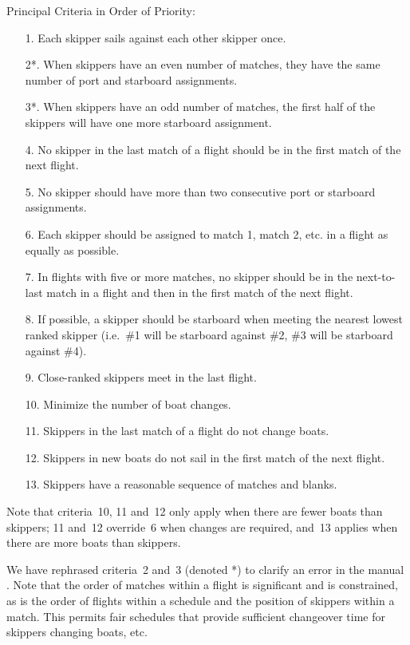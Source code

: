 \documentclass{llncs}
\begin{document}
\begin{framed}
\noindent Principal Criteria in Order of Priority:
\begin{enumerate}
\item[1.] Each skipper sails against each other skipper once.
\item[2*.] When skippers have an even number of matches, they have the same number of port and starboard
    assignments.
\item[3*.] When skippers have an odd number of matches, the first half of the skippers will have one
    more starboard assignment.
\item[4.] No skipper in the last match of a flight should be in the first match of the next flight.
\item[5.] No skipper should have more than two consecutive port or starboard assignments.
\item[6.] Each skipper should be assigned to match 1, match 2, etc. in a flight as equally as possible.
\item[7.] In flights with five or more matches, no skipper should be in the next-to-last match in a
    flight and then in the first match of the next flight.
\item[8.] If possible, a skipper should be starboard when meeting the nearest lowest ranked skipper
    (i.e.\ \#1 will be starboard against \#2, \#3 will be starboard against \#4).
\item[9.] Close-ranked skippers meet in the last flight.
\item[10.] Minimize the number of boat changes.
\item[11.] Skippers in the last match of a flight do not change boats.
\item[12.] Skippers in new boats do not sail in the first match of the next flight.
\item[13.] Skippers have a reasonable sequence of matches and blanks.
\end{enumerate}
Note that criteria~10, 11 and~12 only apply when there are fewer boats than skippers; 11 and~12
override~6 when changes are required, and~13 applies when there are more boats than skippers.
\end{framed}

We have rephrased criteria~2 and~3 (denoted *) to clarify an error in the manual \cite{isaf}. Note
that the order of matches within a flight is significant and is constrained, as is the order of
flights within a schedule and the position of skippers within a match. This permits fair schedules
that provide sufficient changeover time for skippers changing boats, etc.
\end{document}
